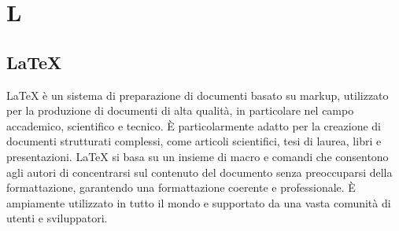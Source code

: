 \section{L}

\vspace{2em}
\subsection*{LaTeX}
LaTeX è un sistema di preparazione di documenti basato su markup, utilizzato per la produzione di documenti di alta qualità, in particolare nel campo accademico, scientifico e tecnico. È particolarmente adatto per la creazione di documenti strutturati complessi, come articoli scientifici, tesi di laurea, libri e presentazioni. LaTeX si basa su un insieme di macro e comandi che consentono agli autori di concentrarsi sul contenuto del documento senza preoccuparsi della formattazione, garantendo una formattazione coerente e professionale. È ampiamente utilizzato in tutto il mondo e supportato da una vasta comunità di utenti e sviluppatori.
